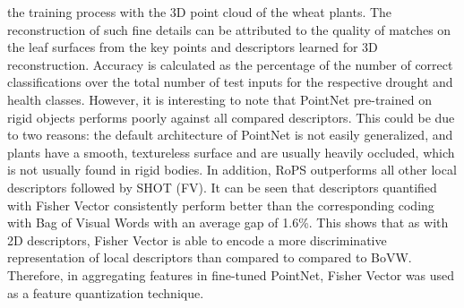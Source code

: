 the training process with the 3D point cloud of the wheat plants. The reconstruction of such fine details can be attributed to the quality of matches on the leaf surfaces
from the key points and descriptors learned for 3D reconstruction. Accuracy is calculated as the percentage of the number of correct classifications over the total
number of test inputs for the respective drought and health classes. However, it is interesting to note that PointNet pre-trained on rigid objects performs poorly against
all compared descriptors. This could be due to two reasons: the default architecture of PointNet is not easily generalized, and plants have a smooth, textureless surface
and are usually heavily occluded, which is not usually found in rigid bodies. In addition, RoPS outperforms all other local descriptors followed by SHOT (FV). It can
be seen that descriptors quantified with Fisher Vector consistently perform better than the corresponding coding with Bag of Visual Words with an average gap of 1.6\%.
This shows that as with 2D descriptors, Fisher Vector is able to encode a more discriminative representation of local descriptors than compared to compared to BoVW.
Therefore, in aggregating features in fine-tuned PointNet, Fisher Vector was used as a feature quantization technique.

